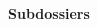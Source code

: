 
\vspace{5mm}
{\bf Subdossiers}\\
\vspace{1mm}
\begin{supertabular*}{\textwidth}{p{4mm}p{20mm}p{55mm}p{35mm}p{10mm}p{10mm}}
\end{supertabular*}
